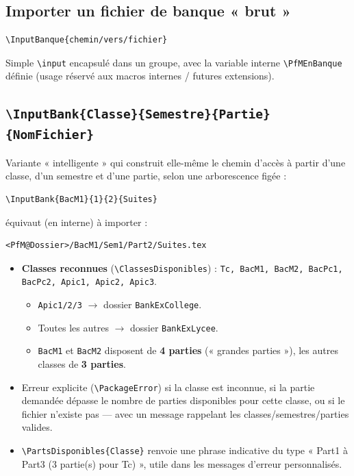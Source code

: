 \documentclass[11pt,a4paper]{article}
\newcommand{\cmdname}[1]{\texttt{\textbackslash#1}}
\begin{document}
\subsection{Importer un fichier de banque « brut »}

\begin{lstlisting}
\InputBanque{chemin/vers/fichier}
\end{lstlisting}

Simple \cmdname{input} encapsulé dans un groupe, avec la variable interne \texttt{\textbackslash PfMEnBanque} définie (usage réservé aux macros internes / futures extensions).

\subsection{\cmdname{InputBank\{Classe\}\{Semestre\}\{Partie\}\{NomFichier\}}}

Variante « intelligente » qui construit elle-même le chemin d'accès à partir d'une classe, d'un semestre et d'une partie, selon une arborescence figée :

\begin{lstlisting}
\InputBank{BacM1}{1}{2}{Suites}
\end{lstlisting}

équivaut (en interne) à importer :

\begin{lstlisting}
<PfM@Dossier>/BacM1/Sem1/Part2/Suites.tex
\end{lstlisting}

\begin{itemize}
  \item \textbf{Classes reconnues} (\texttt{\textbackslash ClassesDisponibles}) : \texttt{Tc, BacM1, BacM2, BacPc1, BacPc2, Apic1, Apic2, Apic3}.
  \begin{itemize}
    \item \texttt{Apic1/2/3} $\rightarrow$ dossier \texttt{BankExCollege}.
    \item Toutes les autres $\rightarrow$ dossier \texttt{BankExLycee}.
    \item \texttt{BacM1} et \texttt{BacM2} disposent de \textbf{4 parties} (« grandes parties »), les autres classes de \textbf{3 parties}.
  \end{itemize}
  \item Erreur explicite (\texttt{\textbackslash PackageError}) si la classe est inconnue, si la partie demandée dépasse le nombre de parties disponibles pour cette classe, ou si le fichier n'existe pas — avec un message rappelant les classes/semestres/parties valides.
  \item \cmdname{PartsDisponibles\{Classe\}} renvoie une phrase indicative du type « Part1 à Part3 (3 partie(s) pour Tc) », utile dans les messages d'erreur personnalisés.
\end{itemize}
\end{document}
